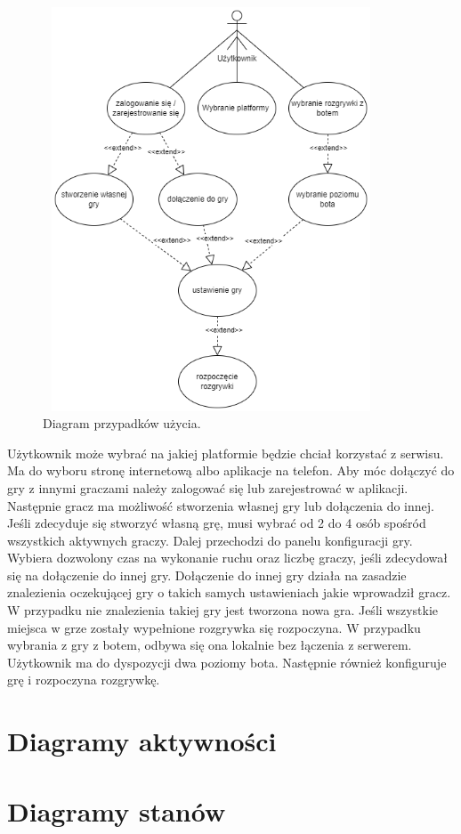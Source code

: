 \begin{figure}[h!]
	\begin{center}
		\includegraphics[width=10cm,height=12cm]{img/przypadki-uzycia.png}
	\end{center}
	\caption{{\color{dgray} Diagram przypadków użycia.}} 
	\label{przypadki_uzycia}
\end{figure} 

Użytkownik może wybrać na jakiej platformie będzie chciał korzystać z serwisu. Ma do wyboru stronę internetową albo aplikacje na telefon. Aby móc dołączyć do gry z innymi graczami należy zalogować się lub zarejestrować w aplikacji. Następnie gracz ma możliwość stworzenia własnej gry lub dołączenia do innej. Jeśli zdecyduje się stworzyć własną grę, musi wybrać od 2 do 4 osób spośród wszystkich aktywnych graczy. Dalej przechodzi do panelu konfiguracji gry. Wybiera dozwolony czas na wykonanie ruchu oraz liczbę graczy, jeśli zdecydował się na dołączenie do innej gry. Dołączenie do innej gry działa na zasadzie znalezienia oczekującej gry o takich samych ustawieniach jakie wprowadził gracz. W przypadku nie znalezienia takiej gry jest tworzona nowa gra. Jeśli wszystkie miejsca w grze zostały wypełnione rozgrywka się rozpoczyna. W przypadku wybrania z gry z botem, odbywa się ona lokalnie bez łączenia z serwerem. Użytkownik ma do dyspozycji dwa poziomy bota. Następnie również konfiguruje grę i rozpoczyna rozgrywkę.

\section{Diagramy aktywności}


\section{Diagramy stanów}




